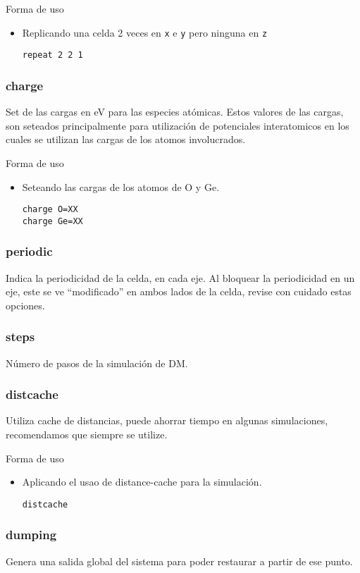 \documentclass[a4paper,10pt]{scrbook}
\newcommand{\control}[1]{\begin{center}\begin{minipage}{10cm}\texttt{#1}\end{minipage}\end{center}}
\begin{document}
Forma de uso

\begin{itemize}
 \item Replicando una celda 2 veces en \verb|x| e \verb|y| pero ninguna en \verb|z|
\control{repeat 2 2 1}
\end{itemize}

\subsubsection{charge}
Set de las cargas en eV para las especies at\'omicas. Estos valores de las cargas, son seteados principalmente para utilizaci\'on de potenciales interatomicos en los cuales se utilizan las cargas de los atomos involucrados.

Forma de uso

\begin{itemize}
 \item Seteando las cargas de los atomos de O y Ge.
\control{charge O=XX \\ charge Ge=XX}
\end{itemize}

\subsubsection{periodic}
Indica la periodicidad de la celda, en cada eje. Al bloquear la periodicidad en un eje, este se ve ``modificado'' en ambos lados de la celda, revise con cuidado estas opciones.

\subsubsection{steps}
N\'umero de pasos de la simulaci\'on de DM.

\subsubsection{distcache}
Utiliza cache de distancias, puede ahorrar tiempo en algunas simulaciones, recomendamos que siempre se utilize.

Forma de uso

\begin{itemize}
 \item Aplicando el usao de distance-cache para la simulaci\'on.
\control{distcache}
\end{itemize}

\subsubsection{dumping}
Genera una salida global del sistema para poder restaurar a partir de ese punto.
\end{document}
